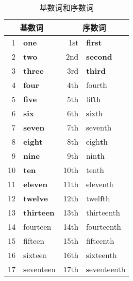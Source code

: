\begin{table}[tp!]
  \centering \footnotesize
  \caption[skip=2pt]{基数词和序数词}
  \label{tab:onefirst}
  \begin{tabular}[hp!]{rlrl}
    \toprule
    \multicolumn{2}{c}{基数词 } & \multicolumn{2}{c}{序数词 } \\ \midrule
    1         & \textbf{one}                   & 1st         & \textbf{first}                   \\
    2         & \textbf{two}                   & 2nd         & \textbf{second}                  \\
    3         & \textbf{three}                 & 3rd         & \textbf{third}                   \\
    4         & \textbf{four}                  & 4th         & fourth                     \\
    5         & \textbf{five}                  & 5th         & fi\textbf{f}th                   \\
    6         & \textbf{six}                   & 6th         & sixth                      \\
    7         & \textbf{seven}                 & 7th         & seventh                    \\
    8         & \textbf{eight}                 & 8th         & eigh\textbf{t}h                  \\
    9         & \textbf{nine}                  & 9th         & nin\textbf{t}h                   \\
    10        & \textbf{ten}                   & 10th        & tenth                      \\
    11        & \textbf{eleven}                & 11th        & eleventh                   \\
    12        & \textbf{twelve}                & 12th        & twel\textbf{f}th                 \\
    13        & \textbf{thirteen}              & 13th        & thirteenth                 \\
    14        & fourteen                 & 14th        & fourteenth                 \\
    15        & fifteen                  & 15th        & fifteenth                  \\
    16        & sixteen                  & 16th        & sixteenth                  \\
    17        & seventeen                & 17th        & seventeenth                \\

\end{tabular}
\end{table}
